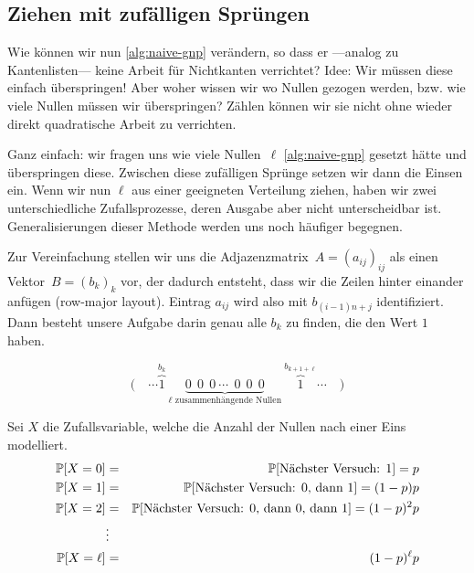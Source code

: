 \subsection{Ziehen mit zufälligen Sprüngen}\label{subsec:gnp_zufaellige_spruenge}
Wie können wir nun \cref{alg:naive-gnp} verändern, so dass er ---analog zu Kantenlisten--- keine Arbeit für Nichtkanten verrichtet?
Idee: Wir müssen diese einfach überspringen!
Aber woher wissen wir wo \glqq Nullen\grqq{} gezogen werden, bzw. wie viele Nullen müssen wir überspringen?
Zählen können wir sie nicht ohne wieder direkt quadratische Arbeit zu verrichten.

Ganz  einfach: wir fragen uns wie viele Nullen~$\ell$ \cref{alg:naive-gnp} gesetzt hätte und überspringen diese.
Zwischen diese zufälligen Sprünge setzen wir dann die Einsen ein.
Wenn wir nun $\ell$ aus einer geeigneten Verteilung ziehen, haben wir zwei unterschiedliche Zufallsprozesse, deren Ausgabe aber nicht unterscheidbar ist.
Generalisierungen dieser Methode werden uns noch häufiger begegnen.

Zur  Vereinfachung stellen wir uns die Adjazenzmatrix~$A = (a_{ij})_{ij}$ als einen Vektor~$B = (b_k)_k$ vor, der dadurch entsteht, dass wir die Zeilen hinter einander anfügen (row-major layout).
Eintrag $a_{ij}$ wird also mit $b_{(i-1)n + j}$ identifiziert.
Dann besteht unsere Aufgabe darin genau alle $b_k$ zu finden, die den Wert $1$ haben.

\begin{equation}
    \Big(\quad \cdots \overbrace{1}^{b_k} \ \underbrace{0 \ \ 0\ \ 0 \ \cdots\ \ 0\ \ 0\ \ 0}_{\text{$\ell$ zusammenhängende Nullen}}\  \overbrace{1}^{b_{k + 1+ \ell}} \cdots \quad \Big)
\end{equation}

\noindent
Sei $X$ die  Zufallsvariable, welche die Anzahl der Nullen nach einer Eins modelliert.
\begin{eqnarray}
    \mathbb{P}\!\left[X = 0\right] &=& \mathbb{P}\!\left[\text{Nächster Versuch: 1}\right] = p \\
    \mathbb{P}\!\left[X = 1\right] &=& \mathbb{P}\!\left[\text{Nächster Versuch: 0, dann 1}\right] = (1 - p)p \\
    \mathbb{P}\!\left[X = 2\right] &=& \mathbb{P}\!\left[\text{Nächster Versuch: 0, dann 0, dann 1}\right] = (1 - p)^2 p \\
    &\vdots& \\
    \mathbb{P}\!\left[X = \ell\right] &=& (1 - p)^\ell p
\end{eqnarray}

